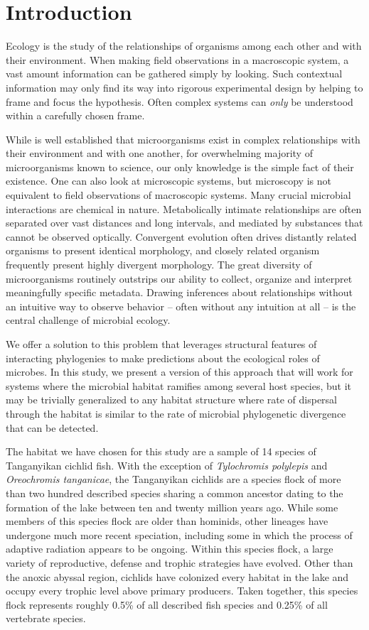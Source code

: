 \section{Introduction}

Ecology is the study of the relationships of organisms among each other and with their environment. When making field observations in a macroscopic system, a vast amount information can be gathered simply by looking. Such contextual information may only find its way into rigorous experimental design by helping to frame and focus the hypothesis. Often complex systems can {\em only} be understood within a carefully chosen frame.

While is well established that microorganisms exist in complex relationships with their environment and with one another, for overwhelming majority of microorganisms known to science, our only knowledge is the simple fact of their existence. One can also look at microscopic systems, but microscopy is not equivalent to field observations of macroscopic systems. Many crucial microbial interactions are chemical in nature. Metabolically intimate relationships are often separated over vast distances and long intervals, and mediated by substances that cannot be observed optically. Convergent evolution often drives distantly related organisms to present identical morphology, and closely related organism frequently present highly divergent morphology. The great diversity of microorganisms routinely outstrips our ability to collect, organize and interpret meaningfully specific metadata. Drawing inferences about relationships without an intuitive way to observe behavior -- often without any intuition at all -- is the central challenge of microbial ecology. 

We offer a solution to this problem that leverages structural features of interacting phylogenies to make predictions about the ecological roles of microbes. In this study, we present a version of this approach that will work for systems where the microbial habitat ramifies among several host species, but it may be trivially generalized to any habitat structure where rate of dispersal through the habitat is similar to the rate of microbial phylogenetic divergence that can be detected.

The habitat we have chosen for this study are a sample of 14 species of Tanganyikan cichlid fish. With the exception of {\em Tylochromis polylepis} and {\em Oreochromis tanganicae}, the Tanganyikan cichlids are a species flock of more than two hundred described species sharing a common ancestor dating to the formation of the lake between ten and twenty million years ago. While some members of this species flock are older than hominids, other lineages have undergone much more recent speciation, including some in which the process of adaptive radiation appears to be ongoing. Within this species flock, a large variety of reproductive, defense and trophic strategies have evolved. Other than the anoxic abyssal region, cichlids have colonized every habitat in the lake and occupy every trophic level above primary producers. Taken together, this species flock represents roughly 0.5\% of all described fish species and 0.25\% of all vertebrate species.

